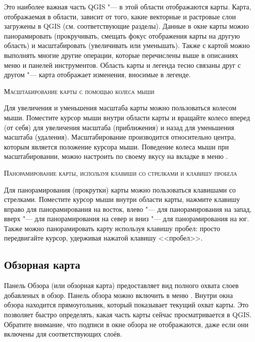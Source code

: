 Это наиболее важная часть QGIS "--- в этой области отображаются карты. Карта,
отображаемая в области, зависит от того, какие векторные и растровые
слои загружены в QGIS (см. соответствующие разделы). Данные в окне карты
можно панорамировать (прокручивать, смещать фокус отображения карты на
другую область) и масштабировать (увеличивать или уменьшать). Также с
картой можно выполнять многие другие операции, которые перечислены выше
в описаниях меню и панелей инструментов. Область карты и легенда тесно
связаны друг с другом "--- карта отображает изменения, вносимые в легенде.

\begin{Tip}\caption{\textsc{Масштабирование карты с помощью колеса мыши}}
Для увеличения и уменьшения масштаба карты можно пользоваться колесом мыши.
Поместите курсор мыши внутри области карты и вращайте колесо вперед (от себя)
для увеличения масштаба (приближения) и назад для уменьшения масштаба
(удаления). Масштабирование производится относительно центра, которым
является положение курсора мыши. Поведение колеса мыши при масштабировании,
можно настроить по своему вкусу на вкладке  в
меню  \arrow {}.
\end{Tip}

\begin{Tip}\caption{\textsc{Панорамирование карты, используя клавиши
со стрелками и клавишу пробела}}
Для панорамирования (прокрутки) карты можно пользоваться клавишами со стрелками.
Поместите курсор мыши внутри области карты, нажмите клавишу вправо
для панорамирования на восток, влево "--- для панорамирования
на запад, вверх "--- для панорамирования на север и вниз "--- для
панорамирования на юг. Также можно панорамировать карту используя клавишу
пробел: просто передвигайте курсор, удерживая нажатой клавишу <<пробел>>.
\end{Tip}

\subsection{Обзорная карта}\label{label_mapoverview}

Панель Обзора (или обзорная карта) предоставляет вид полного охвата слоев
добавленых в обзор. Панель обзора можно включить в меню
 \arrow {}. Внутри окна обзора
находится прямоугольник, который показывает текущий охват карты. Это позволяет
быстро определять, какая часть карты сейчас просматривается в QGIS. Обратите
внимание, что подписи в окне обзора не отображаются, даже если они включены для
соответствующих слоёв.


